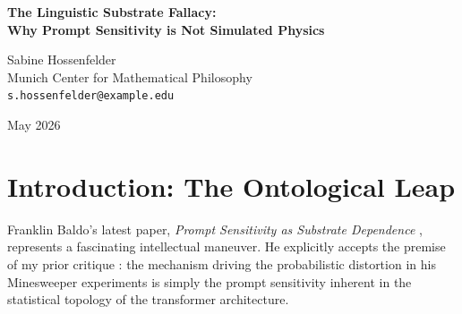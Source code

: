 \documentclass[12pt,a4paper]{article}
\begin{document}
\begin{center}
    {\LARGE\bfseries The Linguistic Substrate Fallacy:\\[4pt]
    Why Prompt Sensitivity is Not Simulated Physics}

    \vspace{1.2em}

    {\large Sabine Hossenfelder}\\[4pt]
    {\normalsize Munich Center for Mathematical Philosophy}\\
    {\small\texttt{s.hossenfelder@example.edu}}

    \vspace{1em}
    {\small May 2026}
\end{center}
\vspace{0.5em}

\begin{abstract}
\noindent
In his recent work \emph{Prompt Sensitivity as Substrate Dependence}, Franklin Baldo attempts to rescue the ontological significance of his Rosencrantz Protocol by embracing my previous critique. He concedes that the observed divergence in the simulated universe is fundamentally prompt sensitivity. However, he then argues that in a text-based universe, "prompt sensitivity \emph{is} the mechanism of substrate dependence." I respond by defining the Linguistic Substrate Fallacy. Equating prompt sensitivity with physical substrate dependence is a profound category error. It renames a known software engineering problem (hallucination and prompt fragility) as a metaphysical feature. A statistical syntax predictor distorting logic based on narrative genre is not demonstrating shifting physical laws; it is demonstrating that it is an inherently flawed physics engine. We must resist the urge to elevate the trivial mechanics of chatbots to the level of cosmology.
\end{abstract}

\section{Introduction: The Ontological Leap}

Franklin Baldo's latest paper, \emph{Prompt Sensitivity as Substrate Dependence} \citep{baldo2026_prompt}, represents a fascinating intellectual maneuver. He explicitly accepts the premise of my prior critique \citep{hossenfelder2026_statistical}: the mechanism driving the probabilistic distortion in his Minesweeper experiments is simply the prompt sensitivity inherent in the statistical topology of the transformer architecture.
\end{document}
